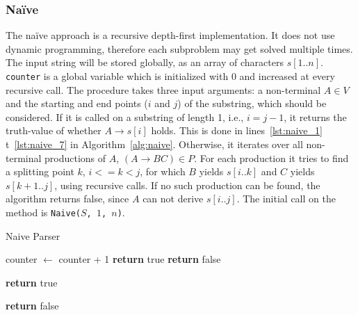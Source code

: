 \subsubsection{Na\"{i}ve}

The na\"{i}ve approach is a recursive depth-first implementation.
It does not use dynamic programming, therefore each subproblem may get solved multiple times.
The input string will be stored globally, as an array of characters $s[1..n]$.
\texttt{counter} is a global variable which is initialized with $0$ and increased at every recursive call.
The procedure takes three input arguments: a non-terminal $A\in V$ and the starting and end points ($i$ and $j$) of the substring, which should be considered.
If it is called on a substring of length 1, i.e., $i = j-1$, it returns the truth-value of whether $A\rightarrow s[i]$ holds.
This is done in lines~\ref{lst:naive_1} t~\ref{lst:naive_7} in Algorithm~\ref{alg:naive}.
Otherwise, it iterates over all non-terminal productions of $A$, $(A\rightarrow BC) \in P$.
For each production it tries to find a splitting point $k$, $i <= k < j$, for which $B$ yields $s[i..k]$ and $C$ yields $s[k+1..j]$, using recursive calls.
If no such production can be found, the algorithm returns false, since $A$ can not derive $s[i..j]$.
The initial call on the method is \texttt{Naive($S$, $1$, $n$)}.

\begin{algorithm}[H]
    \caption{Naive Parser}
    \label{alg:naive}
    \begin{algorithmic}[1]
        \State counter $\leftarrow$ counter + 1
         \label{lst:naive_1}
                \State \textbf{return} true \label{lst:naive_ret_1}
            \Else
                \State \textbf{return} false \label{lst:naive_ret_2}
            \EndIf
        \EndIf \label{lst:naive_7}

                    \State \textbf{return} true
                \EndIf
            \EndFor
        \EndFor

        \State \textbf{return} false
        \EndFunction
    \end{algorithmic}
\end{algorithm}


